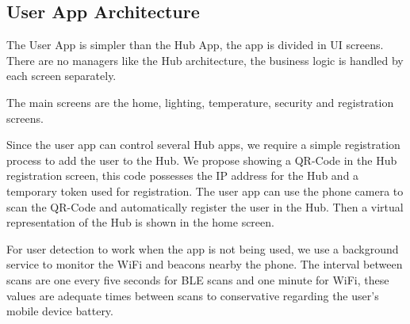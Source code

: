 \subsection{User App Architecture}
The User App is simpler than the Hub App, the app is divided in \ac{UI} screens. There are no managers like the Hub architecture, the business logic is handled by each screen separately. 


The main screens are the home, lighting, temperature, security and registration screens.

Since the user app can control several Hub apps, we require a simple registration process to add the user to the Hub. We propose showing a QR-Code in the Hub registration screen, this code possesses the \ac{IP} address for the Hub and a temporary token used for registration. The user app can use the phone camera to scan the QR-Code and automatically register the user in the Hub. Then a virtual representation of the Hub is shown in the home screen.

For user detection to work when the app is not being used, we use a background service to monitor the \ac{WiFi} and beacons nearby the phone. The interval between scans are one every five seconds for \ac{BLE} scans and one minute for WiFi, these values are adequate times between scans to conservative regarding the user's mobile device battery.


